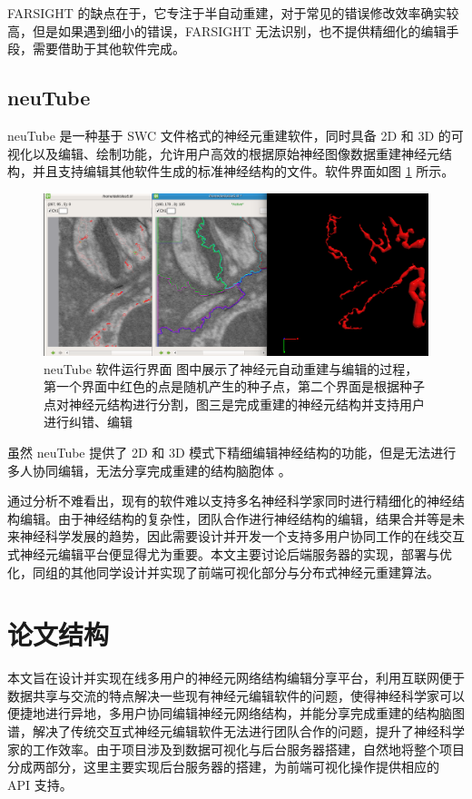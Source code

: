 FARSIGHT 的缺点在于，它专注于半自动重建，对于常见的错误修改效率确实较高，但是如果遇到细小的错误，FARSIGHT 无法识别，也不提供精细化的编辑手段，需要借助于其他软件完成。

\subsection{neuTube}
neuTube 是一种基于 SWC 文件格式的神经元重建软件，同时具备 2D 和 3D 的可视化以及编辑、绘制功能，允许用户高效的根据原始神经图像数据重建神经元结构，并且支持编辑其他软件生成的标准神经结构的文件。软件界面如图 \ref{neutube} 所示。

\begin{figure}[!ht]
\centering
\includegraphics[width=148mm]{images/neutube}
\caption{neuTube 软件运行界面 图中展示了神经元自动重建与编辑的过程，第一个界面中红色的点是随机产生的种子点，第二个界面是根据种子点对神经元结构进行分割，图三是完成重建的神经元结构并支持用户进行纠错、编辑}
\label{neutube}
\end{figure}

虽然 neuTube 提供了 2D 和 3D 模式下精细编辑神经结构的功能，但是无法进行多人协同编辑，无法分享完成重建的结构脑胞体 。

通过分析不难看出，现有的软件难以支持多名神经科学家同时进行精细化的神经结构编辑。由于神经结构的复杂性，团队合作进行神经结构的编辑，结果合并等是未来神经科学发展的趋势，因此需要设计并开发一个支持多用户协同工作的在线交互式神经元编辑平台便显得尤为重要。本文主要讨论后端服务器的实现，部署与优化，同组的其他同学设计并实现了前端可视化部分与分布式神经元重建算法。

\section{论文结构}
本文旨在设计并实现在线多用户的神经元网络结构编辑分享平台，利用互联网便于数据共享与交流的特点解决一些现有神经元编辑软件的问题，使得神经科学家可以便捷地进行异地，多用户协同编辑神经元网络结构，并能分享完成重建的结构脑图谱，解决了传统交互式神经元编辑软件无法进行团队合作的问题，提升了神经科学家的工作效率。由于项目涉及到数据可视化与后台服务器搭建，自然地将整个项目分成两部分，这里主要实现后台服务器的搭建，为前端可视化操作提供相应的 API 支持。

